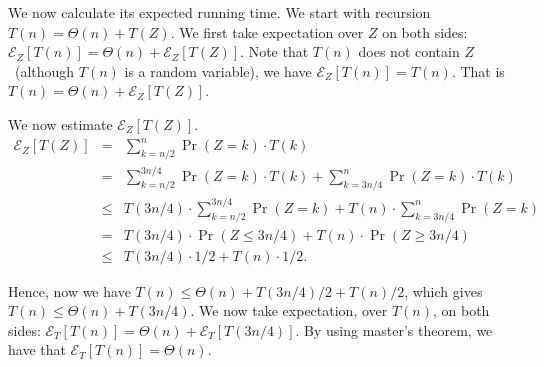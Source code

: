 We now calculate its expected running time.
We start with recursion $T(n) = \Theta(n) + T(Z)$.
We first take expectation over $Z$ on both sides: 
$\mathcal{E}_Z [T(n)] = \Theta(n) + \mathcal{E}_Z [T(Z)]$.
Note that $T(n)$ does not contain $Z$~(although $T(n)$ is a random variable), we have 
$\mathcal{E}_Z [T(n)] = T(n)$. That is
$T(n) = \Theta(n) + \mathcal{E}_Z [T(Z)]$.

We now estimate $\mathcal{E}_Z [T(Z)]$.
\begin{eqnarray*}
\mathcal{E}_Z [T(Z)] & = & \sum_{k = n/2}^n \Pr(Z = k) \cdot T(k) \\
 & = & \sum_{k = n/2}^{3n/4} \Pr(Z = k) \cdot T(k)  + \sum_{k = 3n/4}^{n} \Pr(Z = k) \cdot T(k)  \\
 & \le  & T(3n/4) \cdot \sum_{k = n/2}^{3n/4} \Pr(Z = k)  + T(n) \cdot \sum_{k = 3n/4}^{n} \Pr(Z = k)\\
 & =  & T(3n/4) \cdot \Pr(Z \le 3n/4)  + T(n) \cdot \Pr(Z \ge 3n/4)\\
 & \le  & T(3n/4) \cdot 1/2  + T(n) \cdot 1/2.
\end{eqnarray*}

Hence, now we have $T(n) \le \Theta(n) + T(3n/4)/2 + T(n)/2$, which gives $T(n) \le \Theta(n) + T(3n/4)$.
We now take expectation, over $T(n)$, on both sides:
$\mathcal{E}_T [T(n)] = \Theta(n) + \mathcal{E}_T [T(3n/4)]$.
By using master's theorem, we have that $\mathcal{E}_T [T(n)] = \Theta(n)$.
